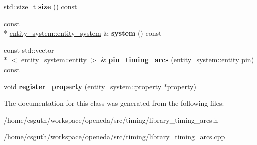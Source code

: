 \begin{DoxyCompactItemize}
\item 
\hypertarget{classophidian_1_1timing_1_1library__timing__arcs_a32593c010255c8a6c731119eafd8e1ad}{std\-::size\-\_\-t {\bfseries size} () const }\label{classophidian_1_1timing_1_1library__timing__arcs_a32593c010255c8a6c731119eafd8e1ad}

\item 
\hypertarget{classophidian_1_1timing_1_1library__timing__arcs_a9ae17f9b7fd3e1d3f2d89a7b099ddbb6}{const \\*
\hyperlink{classophidian_1_1entity__system_1_1entity__system}{entity\-\_\-system\-::entity\-\_\-system} \& {\bfseries system} () const }\label{classophidian_1_1timing_1_1library__timing__arcs_a9ae17f9b7fd3e1d3f2d89a7b099ddbb6}

\item 
\hypertarget{classophidian_1_1timing_1_1library__timing__arcs_ae31b4a5898ef318a188247c3410eeae9}{const std\-::vector\\*
$<$ entity\-\_\-system\-::entity $>$ \& {\bfseries pin\-\_\-timing\-\_\-arcs} (entity\-\_\-system\-::entity pin) const }\label{classophidian_1_1timing_1_1library__timing__arcs_ae31b4a5898ef318a188247c3410eeae9}

\item 
\hypertarget{classophidian_1_1timing_1_1library__timing__arcs_a3cf48d765b8f8b30c743f3294e5a03b9}{void {\bfseries register\-\_\-property} (\hyperlink{classophidian_1_1entity__system_1_1property}{entity\-\_\-system\-::property} $\ast$property)}\label{classophidian_1_1timing_1_1library__timing__arcs_a3cf48d765b8f8b30c743f3294e5a03b9}

\end{DoxyCompactItemize}


The documentation for this class was generated from the following files\-:\begin{DoxyCompactItemize}
\item 
/home/csguth/workspace/openeda/src/timing/library\-\_\-timing\-\_\-arcs.\-h\item 
/home/csguth/workspace/openeda/src/timing/library\-\_\-timing\-\_\-arcs.\-cpp\end{DoxyCompactItemize}
